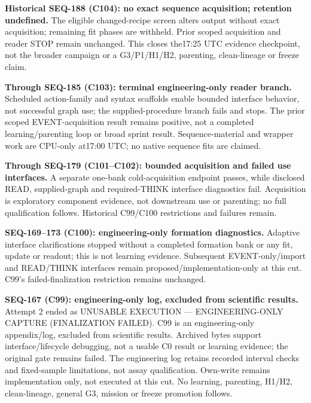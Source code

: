 \documentclass[11pt]{article}
\begin{document}
\noindent\textbf{Historical SEQ-188 (C104): no exact sequence acquisition; retention undefined.}
The eligible changed-recipe screen alters output without exact acquisition;
remaining fit phases are withheld. Prior scoped acquisition and reader STOP
remain unchanged. This closes the17:25 UTC evidence checkpoint, not the
broader campaign or a G3/P1/H1/H2, parenting, clean-lineage or freeze claim.

\noindent\textbf{Through SEQ-185 (C103): terminal engineering-only reader branch.}
Scheduled action-family and syntax scaffolds enable bounded interface behavior,
not successful graph use; the supplied-procedure branch fails and stops.
The prior scoped EVENT-acquisition result remains positive, not a completed
learning/parenting loop or broad sprint result. Sequence-material and wrapper
work are CPU-only at17:00 UTC; no native sequence fits are claimed.

\noindent\textbf{Through SEQ-179 (C101--C102): bounded acquisition and failed use interfaces.}
A separate one-bank cold-acquisition endpoint passes, while disclosed READ,
supplied-graph and required-THINK interface diagnostics fail. Acquisition is
exploratory component evidence, not downstream use or parenting; no full
qualification follows. Historical C99/C100 restrictions and failures remain.

\noindent\textbf{SEQ-169--173 (C100): engineering-only formation diagnostics.}
Adaptive interface clarifications stopped without a completed formation bank
or any fit, update or readout; this is not learning evidence. Subsequent
EVENT-only/import and READ/THINK interfaces remain proposed/implementation-only
at this cut. C99's failed-finalization restriction remains unchanged.

\noindent\textbf{SEQ-167 (C99): engineering-only log, excluded from scientific results.}
Attempt 2 ended as UNUSABLE EXECUTION --- ENGINEERING-ONLY CAPTURE
(FINALIZATION FAILED). C99 is an engineering-only appendix/log, excluded from
scientific results. Archived bytes support interface/lifecycle debugging, not
a usable C0 result or learning evidence; the original gate remains failed.
The engineering log retains recorded interval checks and fixed-sample
limitations, not assay qualification. Own-write remains implementation only,
not executed at this cut. No learning, parenting, H1/H2, clean-lineage,
general G3, mission or freeze promotion follows.
\end{document}
